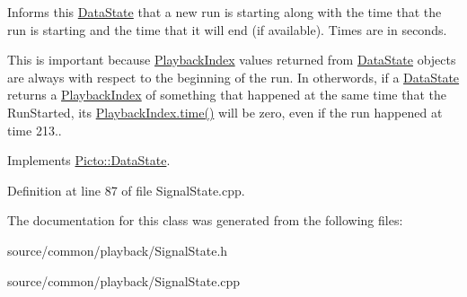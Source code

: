 Informs this \hyperlink{class_picto_1_1_data_state}{Data\-State} that a new run is starting along with the time that the run is starting and the time that it will end (if available). Times are in seconds. 

This is important because \hyperlink{struct_picto_1_1_playback_index}{Playback\-Index} values returned from \hyperlink{class_picto_1_1_data_state}{Data\-State} objects are always with respect to the beginning of the run. In otherwords, if a \hyperlink{class_picto_1_1_data_state}{Data\-State} returns a \hyperlink{struct_picto_1_1_playback_index}{Playback\-Index} of something that happened at the same time that the Run\-Started, its \hyperlink{struct_picto_1_1_playback_index_acbf8f826cfd64d647a098ed165dd3999}{Playback\-Index.\-time()} will be zero, even if the run happened at time 213.. 

Implements \hyperlink{class_picto_1_1_data_state_a8338a5e0c034ccd190e2916e4d60a6e8}{Picto\-::\-Data\-State}.



Definition at line 87 of file Signal\-State.\-cpp.



The documentation for this class was generated from the following files\-:\begin{DoxyCompactItemize}
\item 
source/common/playback/Signal\-State.\-h\item 
source/common/playback/Signal\-State.\-cpp\end{DoxyCompactItemize}
